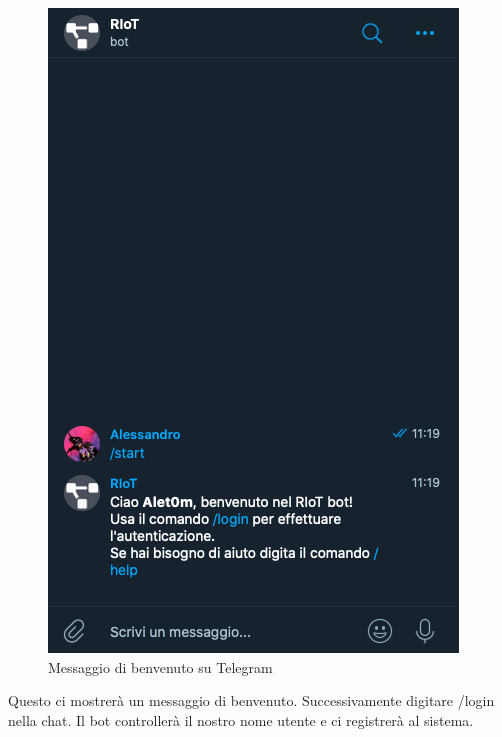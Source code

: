 	\begin{figure}[H]
		\centering
		\includegraphics[scale=0.600]{res/images/membro/mexBenvenuto.png}
		\caption{Messaggio di benvenuto su Telegram}
	\end{figure}

		Questo ci mostrerà un messaggio di benvenuto.
		Successivamente digitare /login nella chat. Il bot controllerà il nostro nome utente e ci registrerà al sistema.

